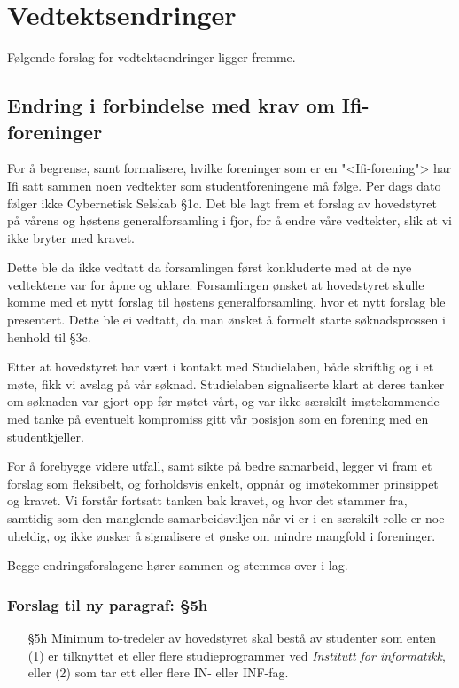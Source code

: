 \documentclass[10pt,norsk,a4paper]{article}
\begin{document}
\newpage

\section{Vedtektsendringer}
Følgende forslag for vedtektsendringer ligger fremme.

\subsection{Endring i forbindelse med krav om Ifi-foreninger}

For å begrense, samt formalisere, hvilke foreninger som er en "<Ifi-forening"> har Ifi satt sammen noen vedtekter som studentforeningene må følge.
Per dags dato følger ikke Cybernetisk Selskab §1c\footnotemark. Det ble lagt frem et forslag av hovedstyret
på vårens og høstens generalforsamling i fjor, for å endre våre vedtekter, slik at vi ikke bryter med
kravet.


Dette ble da ikke vedtatt da forsamlingen først konkluderte med at de nye vedtektene var for åpne og uklare.
Forsamlingen ønsket at hovedstyret skulle komme med et nytt forslag til høstens generalforsamling, hvor et
nytt forslag ble presentert. Dette ble ei vedtatt, da man ønsket å formelt starte søknadsprossen i henhold
til §3c.

Etter at hovedstyret har vært i kontakt med Studielaben, både skriftlig og i et møte, fikk vi avslag på vår
søknad. Studielaben signaliserte klart at deres tanker om søknaden var gjort opp før møtet vårt, og
var ikke særskilt imøtekommende med tanke på eventuelt kompromiss gitt vår posisjon som en forening med
en studentkjeller.

For å forebygge videre utfall, samt sikte på bedre samarbeid, legger vi fram et forslag som fleksibelt, og
forholdsvis enkelt, oppnår og imøtekommer prinsippet og kravet. Vi forstår fortsatt tanken bak kravet, og
hvor det stammer fra, samtidig som den manglende samarbeidsviljen når vi er i en særskilt rolle er
noe uheldig, og ikke ønsker å signalisere et ønske om mindre mangfold i foreninger.

Begge endringsforslagene hører sammen og stemmes over i lag.

\subsubsection{Forslag til ny paragraf: §5h}
\begin{enumerate}
	\item[§5h] Minimum to-tredeler av hovedstyret skal bestå av studenter som enten (1) er tilknyttet et eller flere studieprogrammer ved \textit{Institutt for informatikk}, eller (2) som tar ett eller flere IN- eller INF-fag.
\end{enumerate}
\end{document}
